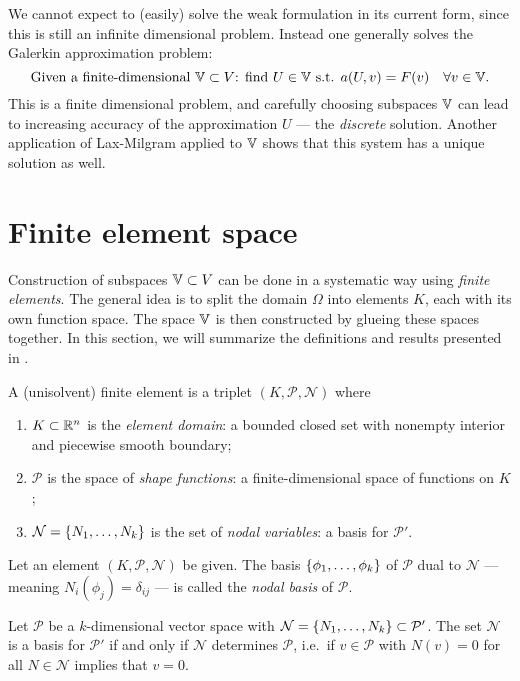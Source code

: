 \documentclass[thesis.tex]{subfiles}
\begin{document}
We cannot expect to (easily) solve the weak formulation in its current form, since this is still an infinite dimensional problem.
Instead one generally solves the Galerkin approximation problem:
\begin{equation}
  \label{eq:galerk_finite}
  \text{Given a finite-dimensional } \mathbb{V} \subset V \text{: find $U \in \mathbb{V}$ s.t. } a(U, v) = F(v) \quad \forall v \in \mathbb{V}.
\end{equation}
This is a finite dimensional problem, and carefully choosing subspaces $\mathbb{V}$ can lead to increasing accuracy of the approximation $U$ --- 
the \emph{discrete} solution. Another application of Lax-Milgram applied to $\mathbb{V}$ shows that this system has a unique solution as well.



\section{Finite element space}
  \label{sec:deffem}
  Construction of subspaces $\mathbb{V} \subset V$ can be done in a systematic way using \emph{finite elements}. 
  The general idea is to split the domain $\Omega$ into elements $K$, each with its own function space.
  The space $\mathbb{V}$ is then constructed by glueing these spaces together. In this section, we will summarize the definitions and results
  presented in \cite[Ch~3]{brenner}.
  \begin{defn} 
    A (unisolvent) finite element is a triplet $(K, \mathcal{P}, \mathcal{N})$ where
    \begin{enumerate}[label=(\alph*)]
      \item $K \subset \mathbb{R}^n$ is the \emph{element domain}: a bounded closed set with nonempty interior and piecewise smooth boundary;
    \item $\mathcal{P}$ is the space of \emph{shape functions}: a finite-dimensional space of functions on $K$;
  \item $\mathcal{N} = \set{N_1, \dots, N_k}$ is the set of \emph{nodal variables}: a basis for $\mathcal{P}'$.
    \end{enumerate}
  \end{defn}
  \begin{defn}
    \label{def:dualbasis}
    Let an element $(K, \mathcal{P}, \mathcal{N})$ be given. The basis $\set{\phi_1, \dots, \phi_k}$ of $\mathcal{P}$ dual to $\mathcal{N}$ --- meaning $N_i(\phi_j) = \delta_{ij}$ --- is called the \emph{nodal basis} of $\mathcal{P}$.
  \end{defn}
  \begin{lem}
    Let $\mathcal{P}$ be a $k$-dimensional vector space with $\mathcal{N} = \set{N_1, \dots, N_k} \subset \mathcal{P}'$.
    The set $\mathcal{N}$ is a basis for $\mathcal{P}'$ if and only if $\mathcal{N}$ determines $\mathcal{P}$, i.e.~if $v \in \mathcal{P}$ with $N(v) = 0$ for all $N \in \mathcal{N}$ implies that $v = 0$.
  \end{lem}
\end{document}
